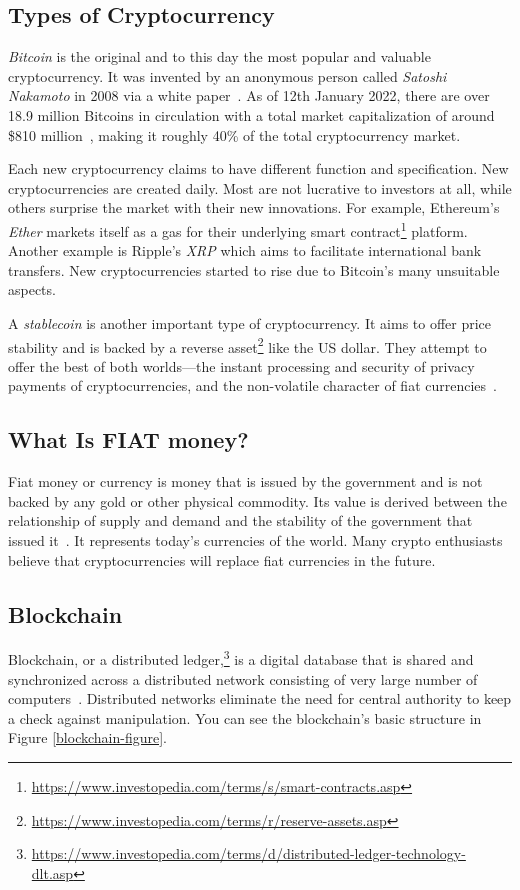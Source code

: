 \subsection*{Types of Cryptocurrency}
\emph{Bitcoin} is the original and to this day the most popular and valuable cryptocurrency. It was invented by an anonymous person called \emph{Satoshi Nakamoto} in 2008 via a white paper~\cite{satoshi}. As of 12th January 2022, there are over 18.9 million Bitcoins in circulation with a total market capitalization of around \$810 million~\cite{coinmarketcap}, making it roughly 40\% of the total cryptocurrency market.

Each new cryptocurrency claims to have different function and specification. New cryptocurrencies are created daily. Most are not lucrative to investors at all, while others surprise the market with their new innovations. For example, Ethereum's \emph{Ether} markets itself as a gas for their underlying smart contract\footnote{\url{https://www.investopedia.com/terms/s/smart-contracts.asp}} platform. Another example is Ripple's \emph{XRP} which aims to facilitate international bank transfers. New cryptocurrencies started to rise due to Bitcoin's many unsuitable aspects.

\label{stablecoins-ref}
A \emph{stablecoin} is another important type of cryptocurrency. It aims to offer price stability and is backed by a reverse asset\footnote{\url{https://www.investopedia.com/terms/r/reserve-assets.asp}} like the US dollar. They attempt to offer the best of both worlds---the instant processing and security of privacy payments of cryptocurrencies, and the non-volatile character of fiat currencies~\cite{investopedia-stablecoin}.

\subsection*{What Is FIAT money?}
﻿Fiat money or currency is money that is issued by the government and is not backed by any gold or other physical commodity. Its value is derived between the relationship of supply and demand and the stability of the government that issued it~\cite{investopedia-fiat}. It represents today's currencies of the world. Many crypto enthusiasts believe that cryptocurrencies will replace fiat currencies in the future.

\subsection*{Blockchain}
\label{blockchain}
Blockchain, or a distributed ledger,\footnote{\url{https://www.investopedia.com/terms/d/distributed-ledger-technology-dlt.asp}} is a digital database that is shared and synchronized across a distributed network consisting of very large number of computers~\cite{investopedia-blockchain}. Distributed networks eliminate the need for central authority to keep a check against manipulation. You can see the blockchain's basic structure in Figure \ref{blockchain-figure}.

